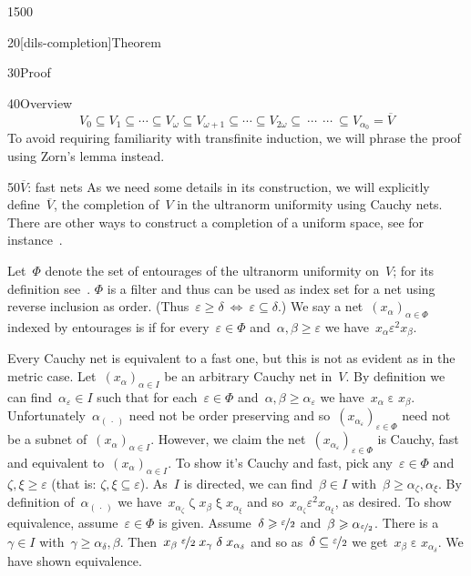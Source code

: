 \begin{parsec}{1500}
\begin{point}{20}[dils-completion]{Theorem}
\begin{point}{30}{Proof}
\begin{point}{40}{Overview}
\begin{equation*}
   V_0 \subseteq V_1 \subseteq \cdots \subseteq V_\omega \subseteq
   V_{\omega+1} \subseteq \cdots \subseteq V_{2\omega} \subseteq
       \ \cdots\ 
       \ \cdots\  \subseteq
   V_{\alpha_0} = \overline{V}
\end{equation*}
To avoid requiring familiarity with transfinite induction,
    we will phrase the proof using Zorn's lemma instead.
\end{point}
\begin{point}{50}{$\overline{V}$: fast nets}%
As we need some details in its construction,
    we will explicitly define~$\overline{V}$,
    the completion of~$V$ in the ultranorm uniformity
    using Cauchy nets.
There are other ways to construct a completion of a uniform space,
    see for instance~\cite[Thm.~39.12]{willard}.

Let~$\Phi$ denote the set of entourages of the ultranorm
    uniformity on~$V$; for its definition see~.
$\Phi$ is a filter and thus can be used as index set for a net
    using reverse inclusion as order.
    (Thus~$\varepsilon \geq \delta
    \ \Leftrightarrow\ \varepsilon \subseteq \delta$.)
We say a net~$(x_\alpha)_{\alpha \in \Phi}$  indexed by entourages
is \Define{fast}\index{Cauchy net!fast} if for every~$\varepsilon \in \Phi$
        and~$\alpha,\beta \geq \varepsilon$
        we have~$x_\alpha \mathrel{\varepsilon^2} x_\beta$.

Every Cauchy net is equivalent to a fast one, but this is not as
    evident as in the metric case.
Let~$(x_\alpha)_{\alpha \in I}$
    be an arbitrary Cauchy net in~$V$.
By definition we can find~$\alpha_\varepsilon \in I$
    such that for each~$\varepsilon \in \Phi$
    and~$\alpha,\beta \geq \alpha_\varepsilon$
    we have~$x_\alpha \mathrel{\varepsilon} x_\beta$.
Unfortunately~$\alpha_{(\,\cdot\,)}$ need not be order preserving
    and so~$(x_{\alpha_{\varepsilon}})_{\varepsilon\in\Phi}$
    need not be a subnet of~$(x_\alpha)_{\alpha \in I}$.
However, we claim the net~$(x_{\alpha_{\varepsilon}})_{\varepsilon\in\Phi}$
    is Cauchy, fast and equivalent to~$(x_{\alpha})_{\alpha\in I}$.
To show it's Cauchy and fast, pick any~$\varepsilon \in \Phi$
    and~$\zeta,\xi \geq \varepsilon$
    (that is: $\zeta,\xi \subseteq \varepsilon$).
As~$I$ is directed, we can find~$\beta\in I$
    with~$\beta \geq \alpha_\zeta, \alpha_\xi$.
By definition of~$\alpha_{(\,\cdot\,)}$
    we have~$x_{\alpha_\zeta} \mathrel\zeta x_{\beta}
        \mathrel\xi x_{\alpha_\xi}$
        and so~$x_{\alpha_\zeta} \mathrel{\varepsilon^2}
                x_{\alpha_\xi}$, as desired.
To show equivalence, assume~$\varepsilon \in \Phi$ is given.
Assume~$\delta \geq \nicefrac{\varepsilon}{2}$
and~$\beta \geq \alpha_{\nicefrac{\varepsilon}{2}}$.
There is a~$\gamma \in I$ with~$\gamma \geq \alpha_\delta,\beta$.
Then~$x_\beta \mathrel{\nicefrac{\varepsilon}{2}}
x_{\gamma} \mathrel{\delta} x_{\alpha_{\delta}}$
and so as~$\delta\subseteq \nicefrac{\varepsilon}{2}$
we get~$x_\beta \mathrel\varepsilon x_{\alpha_\delta}$.
We have shown equivalence.


\end{point}
\end{point}
\end{point}
\end{parsec}
